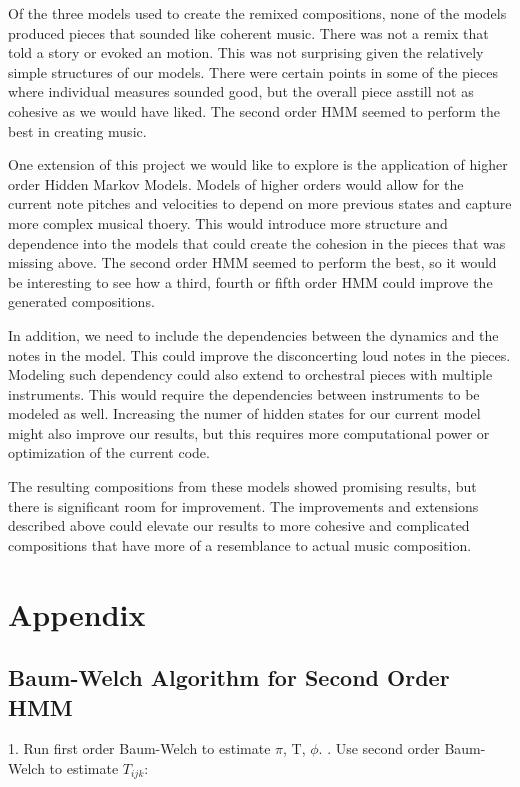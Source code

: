 \documentclass{article} %
\begin{document}
Of the three models used to create the remixed compositions, none of the models produced pieces that sounded like coherent music. There was not a remix that told a story or evoked an motion. This was not surprising given the relatively simple structures of our models. There were certain points in some of the pieces where individual measures sounded good, but the overall piece asstill not as cohesive as we would have liked. The second order HMM seemed to perform the best in creating music. 

One extension of this project we would like to explore is the application of higher order Hidden Markov Models. Models of higher orders would allow for the current note pitches and velocities to depend on more previous states and capture more complex musical thoery. This would introduce more structure and dependence into the models that could create the cohesion in the pieces that was missing above. The second order HMM seemed to perform the best, so it would be interesting to see how a third, fourth or fifth order HMM could improve the generated compositions. 

In addition, we need to include the dependencies between the dynamics and the notes in the model. This could improve the disconcerting loud notes in the pieces. Modeling such dependency could also extend to orchestral pieces with multiple instruments. This would require the dependencies between instruments to be modeled as well. Increasing the numer of hidden states for our current model might also improve our results, but this requires more computational power or optimization of the current code.

The resulting compositions from these models showed promising results, but there is significant room for improvement. The improvements and extensions described above could elevate our results to more cohesive and complicated compositions that have more of a resemblance to actual music composition. 


\newpage

\section{Appendix}

\subsection{Baum-Welch Algorithm for Second Order HMM}
\label{2ndHMM}
1. Run first order Baum-Welch to estimate $\pi$, T, $\phi$. . Use second order Baum-Welch to estimate $T_{ijk}$:\newline
\end{document}
